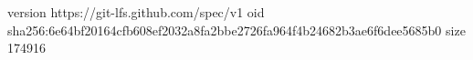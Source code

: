 version https://git-lfs.github.com/spec/v1
oid sha256:6e64bf20164cfb608ef2032a8fa2bbe2726fa964f4b24682b3ae6f6dee5685b0
size 174916
